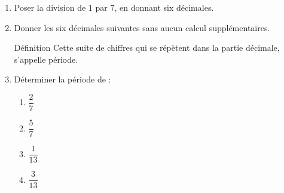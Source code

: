 \begin{exercice*}
    \begin{enumerate}
        \item Poser la division de $1$ par $7$, en donnant six décimales.
        \item Donner les six décimales suivantes sans aucun calcul supplémentaires.
        \begin{myBox}{ Définition}
            Cette suite de chiffres qui se répètent dans la partie décimale, s'appelle période.
        \end{myBox}
        \item Déterminer la période de :
        \begin{multicols}{2}
            \begin{spacing}{1.5}
                \begin{enumerate}
                    \item $\dfrac{2}{7}$
                    \item $\dfrac{5}{7}$
                    \item $\dfrac{1}{13}$
                    \item $\dfrac{3}{13}$
                \end{enumerate}
            \end{spacing}
        \end{multicols}
    \end{enumerate}
\end{exercice*}
